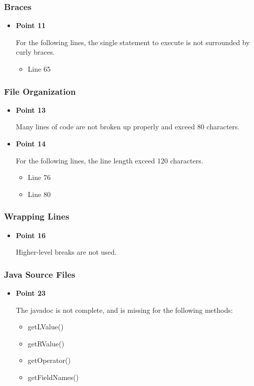 \documentclass[a4paper,11pt]{article}
\begin{document}
	\subsubsection{Braces}
	\begin{itemize}
	\item \textbf{Point 11} 
	
	For the following lines, the single statement to execute is not surrounded by curly braces.
	\begin{itemize}
	\item Line 65
	\end{itemize}
	\end{itemize}
	
	\subsubsection{File Organization}
	\begin{itemize}
	\item \textbf{Point 13} 
	
	Many lines of code are not broken up properly and exceed 80 characters.
	\item \textbf{Point 14} 
	
	For the following lines, the line length exceed 120 characters.
	\begin{itemize}
		\item Line 76
		\item Line 80
		
	\end{itemize}
	\end{itemize}
	
	\subsubsection{Wrapping Lines}
	\begin{itemize}
	\item \textbf{Point 16} 
	
	Higher-level breaks are not used.
	\end{itemize}
	
	\subsubsection{Java Source Files}
	\begin{itemize}
	\item \textbf{Point 23} 
	
	The javadoc is not complete, and is missing for the following methods:
	\begin{itemize}
		\item getLValue()
		\item getRValue()
		\item getOperator()
		\item getFieldNames()
	\end{itemize}
	\end{itemize}
\end{document}
